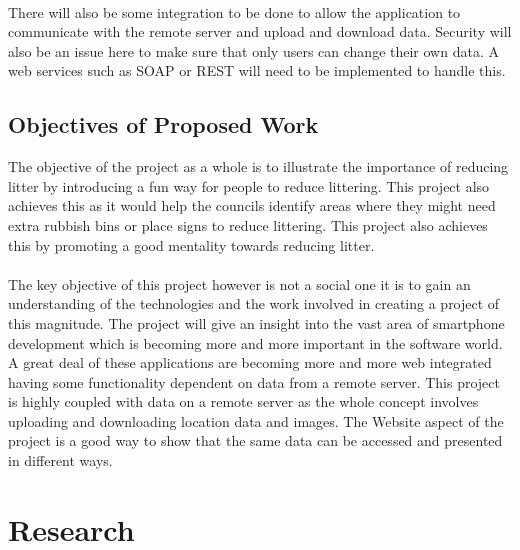 \documentclass[12pt]{article}
\begin{document}
\paragraph{}
\label{par:2par}

There will also be some integration to be done to allow  the application to communicate with the remote server and upload and download data. Security will also be an issue here to make sure that only users can change their own data. A web services such as SOAP or REST will need to be implemented to handle this.



\subsection{Objectives of Proposed Work}

The objective of the project as a whole is to illustrate the importance of reducing litter by introducing a fun way for people to reduce littering.
This project also achieves this as it would help the councils identify areas where they might need extra rubbish bins or place signs to reduce littering. This project also achieves this by promoting a good mentality towards reducing litter.

\paragraph{}
\label{par:2par}

The key objective of this project however is not a social one it is to gain an understanding of the technologies and the work involved in creating a project of this magnitude. The project will give an insight into the vast area of smartphone development which is becoming more and more important in the software world. A great deal of these applications are becoming more and more web integrated having some functionality dependent on data from a remote server. This project is highly coupled with data on a remote server as the whole concept involves uploading and downloading location data and images.
The Website aspect of the project is a good way to show that the same data can be accessed and presented in different ways.


\newpage
\label{sec:Motivation}


\section{Research}
\end{document}
